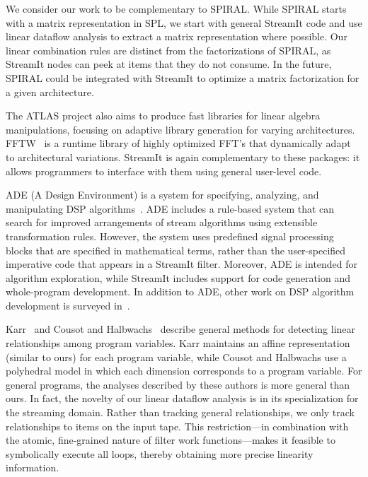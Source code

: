 We consider our work to be complementary to SPIRAL.  While SPIRAL
starts with a matrix representation in SPL, we start with general
StreamIt code and use linear dataflow analysis to extract a matrix
representation where possible.  Our linear combination rules are
distinct from the factorizations of SPIRAL, as StreamIt nodes can peek
at items that they do not consume.  In the future, SPIRAL could be
integrated with StreamIt to optimize a matrix factorization for a
given architecture.

The ATLAS project \cite{whaley01automated} also aims to produce fast
libraries for linear algebra manipulations, focusing on adaptive
library generation for varying architectures.  FFTW~\cite{frigo99fast}
is a runtime library of highly optimized FFT's that dynamically adapt
to architectural variations.  StreamIt is again complementary to these
packages: it allows programmers to interface with them using general
user-level code.

ADE (A Design Environment) is a system for specifying, analyzing, and
manipulating DSP algorithms~\cite{covell-ade}.  ADE includes a
rule-based system that can search for improved arrangements of stream
algorithms using extensible transformation rules.  However, the system
uses predefined signal processing blocks that are specified in
mathematical terms, rather than the user-specified imperative code
that appears in a StreamIt filter.  Moreover, ADE is intended for
algorithm exploration, while StreamIt includes support for code
generation and whole-program development.  In addition to ADE, other
work on DSP algorithm development is surveyed
in~\cite{oppenheim-symbolic}.

Karr~\cite{karr76} and Cousot and Halbwachs~\cite{cousot78} describe
general methods for detecting linear relationships among program
variables.  Karr maintains an affine representation (similar to ours)
for each program variable, while Cousot and Halbwachs use a polyhedral
model in which each dimension corresponds to a program variable.  For
general programs, the analyses described by these authors is more
general than ours.  In fact, the novelty of our linear dataflow
analysis is in its specialization for the streaming domain.  Rather
than tracking general relationships, we only track relationships to
items on the input tape.  This restriction---in combination with the
atomic, fine-grained nature of filter work functions---makes it
feasible to symbolically execute all loops, thereby obtaining more
precise linearity information.

